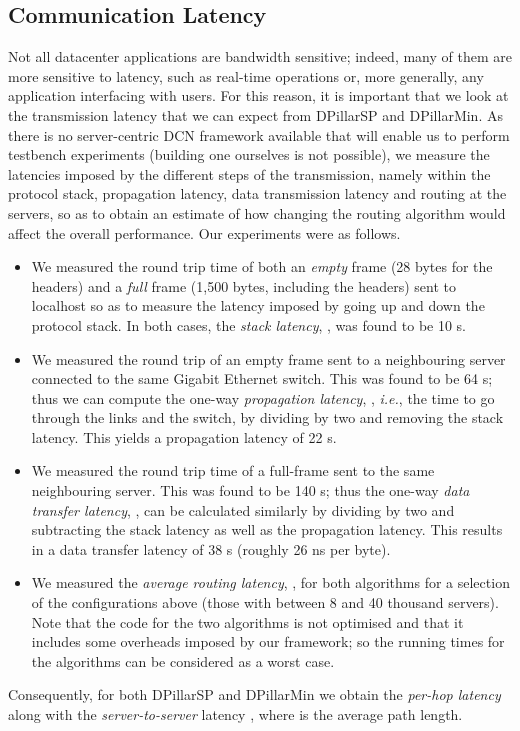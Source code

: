 \documentclass{article}
\newcounter{fig}
\begin{document}
\subsection{Communication Latency} \label{sec:latency}
Not all datacenter applications are bandwidth sensitive; indeed, many of them are more sensitive to latency, such as real-time operations or, more generally, any application interfacing with users. For this reason, it is important that we look at the transmission latency that we can expect from DPillarSP and DPillarMin. As there is no server-centric DCN framework available that will enable us to perform testbench experiments (building one ourselves is not possible), we measure the latencies imposed by the different steps of the transmission, namely within the protocol stack, propagation latency, data transmission latency and routing at the servers, so as to obtain an estimate of how changing the routing algorithm would affect the overall performance. Our experiments were as follows.

\begin{itemize}
	\item We measured the round trip time of both an \emph{empty} frame (28 bytes for the headers) and a \emph{full} frame (1,500 bytes, including the headers) sent to localhost so as to measure the latency imposed by going up and down the protocol stack. In both cases, the \emph{stack latency}, , was found to be 10 s.
	\item We measured the round trip of an empty frame sent to a neighbouring server connected to the same Gigabit Ethernet switch. This was found to be 64 s; thus we can compute the one-way \emph{propagation latency}, , \emph{i.e.}, the time to go through the links and the switch, by dividing by two and removing the stack latency. This yields a propagation latency of 22 s.
	\item We measured the round trip time of a full-frame sent to the same neighbouring server. This was found to be 140 s; thus the one-way \emph{data transfer latency}, , can be calculated similarly by dividing by two and subtracting the stack latency as well as the propagation latency. This results in a data transfer latency of 38 s (roughly 26 ns per byte).
	\item We measured the \emph{average routing latency}, , for both algorithms for a selection of the configurations above (those with between 8 and 40 thousand servers). Note that the code for the two algorithms is not optimised and that it includes some overheads imposed by our framework; so the running times for the algorithms can be considered as a worst case. 
\end{itemize}
Consequently, for both DPillarSP and DPillarMin we obtain the \emph{per-hop latency}  along with the \emph{server-to-server} latency , where  is the average path length.
\end{document}
